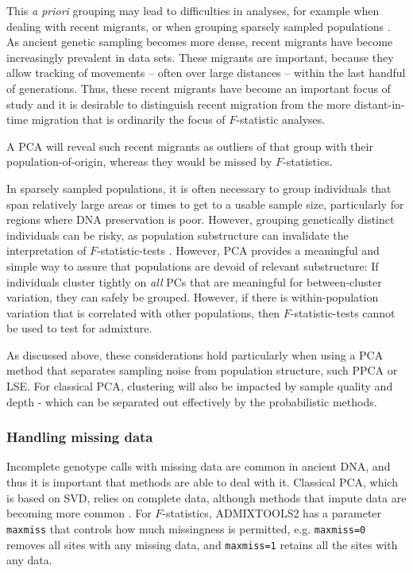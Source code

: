 \documentclass[12pt]{article}
\begin{document}
This \textit{a priori} grouping may lead to difficulties in analyses, for example when dealing with recent migrants, or when grouping sparsely sampled populations \citep{shringarpure_effects_2014}. As ancient genetic sampling becomes more dense, recent migrants have become increasingly prevalent in data sets. These migrants are important, because they allow tracking of movements -- often over large distances -- within the last handful of generations. Thus, these recent migrants have become an important focus of study and it is desirable to distinguish recent migration from the more distant-in-time migration that is ordinarily the focus of $F$-statistic analyses.

A PCA will reveal such recent migrants as outliers of that group with their population-of-origin, whereas they would be missed by $F$-statistics.

In sparsely sampled populations, it is often necessary to group individuals that span relatively large areas or times to get to a usable sample size, particularly for regions where DNA preservation is poor. However, grouping genetically distinct individuals can be risky, as population substructure can invalidate the interpretation of $F$-statistic-tests \citep{peter_admixture_2016}. However, PCA provides a meaningful and simple way to assure that populations are devoid of relevant substructure: If individuals  cluster tightly on \emph{all} PCs that are meaningful for between-cluster variation, they can safely be grouped. However, if there is within-population variation that is correlated with other populations, then $F$-statistic-tests cannot be used to test for admixture. 

As discussed above, these considerations hold particularly when using a PCA method that separates sampling noise from population structure, such PPCA or LSE. For classical PCA, clustering will also be impacted by sample quality and depth - which can be separated out effectively by the probabilistic methods.



\subsubsection{Handling missing data}
Incomplete genotype calls with missing data are common in ancient DNA, and thus it is important that methods are able to deal with it. Classical PCA, which is based on SVD, relies on complete data, although methods that impute data are becoming more common \citep{meisner_large-scale_2021}. For $F$-statistics, ADMIXTOOLS2 has a parameter \texttt{maxmiss} that controls how much missingness is permitted, e.g. \texttt{maxmiss=0} removes all sites with any missing data, and \texttt{maxmiss=1} retains all the sites with any data.
\end{document}
